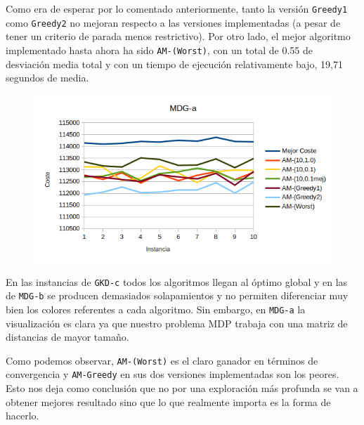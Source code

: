 \newpage
Como era de esperar por lo comentado anteriormente, tanto la versión \texttt{Greedy1} como \texttt{Greedy2} no mejoran respecto a las versiones implementadas (a pesar de tener un criterio de parada menos restrictivo). Por otro lado, el mejor algoritmo implementado hasta ahora ha sido \texttt{AM-(Worst)}, con un total de 0.55 de desviación media total y con un tiempo de ejecución relativamente bajo, 19,71 segundos de media.



	
\begin{figure}[H]
	\centering
	\includegraphics[scale=0.57]{img/gre.png}
\end{figure}



En las instancias de \texttt{GKD-c} todos los algoritmos llegan al óptimo global y en las de \texttt{MDG-b} se producen demasiados solapamientos y no permiten diferenciar muy bien los colores referentes a cada algoritmo. Sin embargo, en \texttt{MDG-a} la visualización es clara ya que nuestro problema MDP trabaja con una matriz de distancias de mayor tamaño. 





Como podemos observar, \texttt{AM-(Worst)} es el claro ganador en términos de convergencia y \texttt{AM-Greedy} en sus dos versiones implementadas son los peores. Esto nos deja como conclusión que no por una exploración más profunda se van a obtener mejores resultado sino que lo que realmente importa es la forma de hacerlo.




